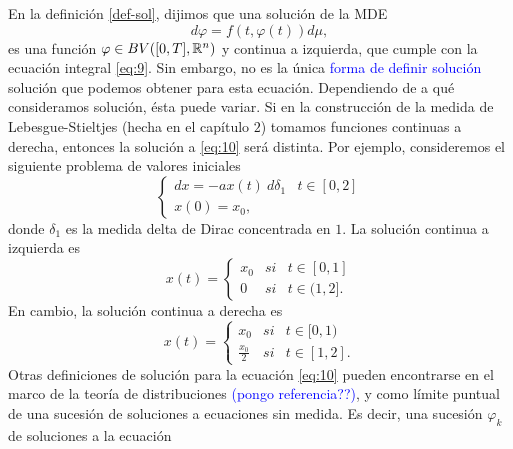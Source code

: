 En la definición  \ref{def-sol}, dijimos que una solución de la MDE %
\begin{equation*}
	d\varphi=f(t,\varphi(t))d\mu,
\end{equation*} 
es una función $\varphi\in BV([0,T],\mathbb{R}^n)$ y continua a izquierda, que cumple con la ecuación integral \eqref{eq:9}. Sin embargo, no es la única \textcolor{blue}{forma de definir  solución} solución que podemos obtener para esta ecuación. Dependiendo de  a qué   consideramos solución, ésta puede variar. Si en la construcción de la medida de Lebesgue-Stieltjes (hecha en el capítulo $2$) tomamos funciones continuas a derecha, entonces la solución a \eqref{eq:10} será distinta. Por ejemplo, consideremos el siguiente problema de valores iniciales
\begin{equation} \label{ej:soluciones}
\left\{\begin{array}{lc}
        dx=-ax(t)\:d\delta_1 & t\in[0,2]  \\
          x(0)=x_0, &
    \end{array}\right.
\end{equation}
donde $\delta_1$ es la medida delta de Dirac concentrada en $1$. La solución continua a izquierda es
\begin{equation*}
x(t)=\left\{\begin{array}{ccc}
        x_0 & si & t\in[0,1]  \\
        0 &si & t\in(1,2].
    \end{array}\right.
\end{equation*}
En cambio, la solución continua a derecha es
\begin{equation*}
x(t)=\left\{\begin{array}{ccc}
        x_0 & si & t\in[0,1)  \\
        \frac{x_0}{2} &si & t\in[1,2].
    \end{array}\right.
\end{equation*}
Otras definiciones de solución para la ecuación \eqref{eq:10} pueden encontrarse en el marco de la teoría de distribuciones \textcolor{blue}{(pongo referencia??)}, y como límite puntual de una sucesión de soluciones a ecuaciones sin medida. Es decir, una sucesión  $\varphi_k$ de soluciones a la ecuación


